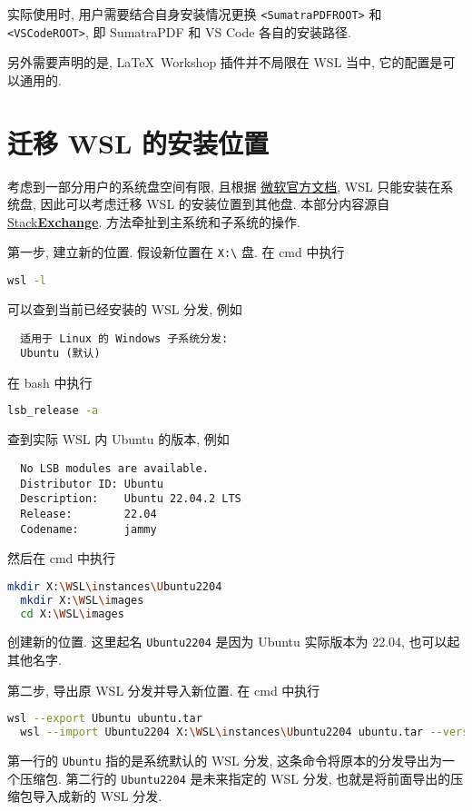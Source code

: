 实际使用时,
用户需要结合自身安装情况更换 \texttt{<SumatraPDFROOT>} 和 \texttt{<VSCodeROOT>},
即 SumatraPDF 和 VS Code 各自的安装路径.

另外需要声明的是,
\LaTeX\ Workshop 插件并不局限在 WSL 当中,
它的配置是可以通用的.

\section{迁移 WSL 的安装位置}

考虑到一部分用户的系统盘空间有限,
且根据%
\href{https://learn.microsoft.com/zh-cn/windows/wsl/troubleshooting?source=recommendations#installation-issues}{微软官方文档},
WSL 只能安装在系统盘,
因此可以考虑迁移 WSL 的安装位置到其他盘.
本部分内容源自
\href{https://superuser.com/questions/1701175/installing-ubuntu-on-mnt-d-with-wsl}{\textsf{Stack\textbf{Exchange}}}.
方法牵扯到主系统和子系统的操作.

第一步,
建立新的位置.
假设新位置在 \texttt{X:\textbackslash} 盘.
在 \textsf{cmd} 中执行
\begin{lstlisting}[language=bash]
  wsl -l
\end{lstlisting}
可以查到当前已经安装的 WSL 分发,
例如
\begin{lstlisting}
  适用于 Linux 的 Windows 子系统分发:
  Ubuntu (默认)
\end{lstlisting}
在 \textsf{bash} 中执行
\begin{lstlisting}[language=bash]
  lsb_release -a
\end{lstlisting}
查到实际 WSL 内 Ubuntu 的版本,
例如
\begin{lstlisting}
  No LSB modules are available.
  Distributor ID: Ubuntu
  Description:    Ubuntu 22.04.2 LTS
  Release:        22.04
  Codename:       jammy
\end{lstlisting}
然后在 \textsf{cmd} 中执行
\begin{lstlisting}[language=bash]
  mkdir X:\WSL\instances\Ubuntu2204
  mkdir X:\WSL\images
  cd X:\WSL\images
\end{lstlisting}
创建新的位置.
这里起名 \texttt{Ubuntu2204} 是因为 Ubuntu 实际版本为 22.04,
也可以起其他名字.

第二步,
导出原 WSL 分发并导入新位置.
在 \textsf{cmd} 中执行
\begin{lstlisting}[language=bash]
  wsl --export Ubuntu ubuntu.tar
  wsl --import Ubuntu2204 X:\WSL\instances\Ubuntu2204 ubuntu.tar --version 2
\end{lstlisting}
第一行的 \texttt{Ubuntu} 指的是系统默认的 WSL 分发,
这条命令将原本的分发导出为一个压缩包.
第二行的 \texttt{Ubuntu2204} 是未来指定的 WSL 分发,
也就是将前面导出的压缩包导入成新的 WSL 分发.

